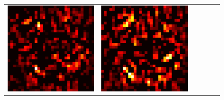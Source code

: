\documentclass[preprint,12pt]{elsarticle}
\begin{document}
\begin{figure}[p]
\begin{tabular}{cccccc}
  \includegraphics[scale=\scale]{../visualizations/examples/cifar10/resnet18/active_saliency_map/1.png} & 
  \includegraphics[scale=\scale]{../visualizations/examples/cifar10/resnet18/inactive_saliency_map/1.png} \\
  

\end{tabular}
\end{figure}
\end{document}
